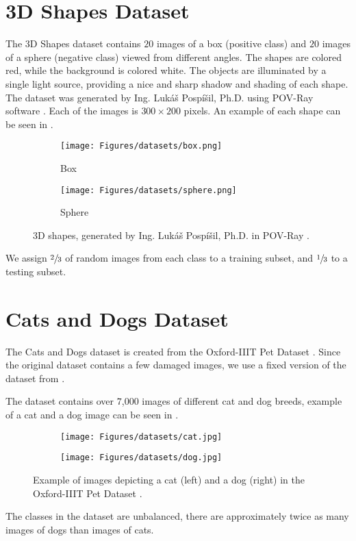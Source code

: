 \section{3D Shapes Dataset}\label{sec:3d-dataset}
The 3D Shapes dataset contains $20$ images of a box (positive class) and $20$ images of a sphere (negative class) viewed from different angles. The shapes are colored red, while the background is colored white. The objects are illuminated by a single light source, providing a nice and sharp shadow and shading of each shape. The dataset was generated by Ing. Lukáš Pospíšil, Ph.D. using POV-Ray software \cite{povray}. Each of the images is $300\times200$ pixels. An example of each shape can be seen in .
\begin{figure}[ht]
    \centering
    \begin{subfigure}[t]{0.3\textwidth}
        \texttt{[image: Figures/datasets/box.png]}
        \caption{Box}
    \end{subfigure}
    \begin{subfigure}[t]{0.3\textwidth}
        \texttt{[image: Figures/datasets/sphere.png]}
        \caption{Sphere}
    \end{subfigure}
    \caption[3D shapes, generated by Ing. Lukáš Pospíšil, Ph.D. in POV-Ray]{3D shapes, generated by Ing. Lukáš Pospíšil, Ph.D. in POV-Ray \cite{povray}.}
    \label{fig:3d_shapes}
\end{figure}

We assign $\sfrac{2}{3}$ of random images from each class to a training subset, and $\sfrac{1}{3}$ to a testing subset.

\section{Cats and Dogs Dataset}\label{sec:cat_dog_dataset}
The Cats and Dogs dataset is created from the Oxford-IIIT Pet Dataset \cite{parkhi12a}. Since the original dataset contains a few damaged images, we use a fixed version of the dataset from \cite{ml4py_dataset}.

The dataset contains over $7$,$000$ images of different cat and dog breeds, example of a cat and a dog image can be seen in .
\begin{figure}[!ht]
    \centering
    \begin{subfigure}[t]{0.45\textwidth}
        \texttt{[image: Figures/datasets/cat.jpg]}
        \label{fig:original:example_cat}
    \end{subfigure}\hfill
    \begin{subfigure}[t]{0.45\textwidth}
        \texttt{[image: Figures/datasets/dog.jpg]}
        \label{fig:original:example_dog}
    \end{subfigure}
    \caption[Example of images depicting a cat (left) and a dog (right) in the Oxford-IIIT Pet Dataset]{Example of images depicting a cat (left) and a dog (right) in the Oxford-IIIT Pet Dataset \cite{parkhi12a}.}
    \label{fig:iiit_pet}
\end{figure}
The classes in the dataset are unbalanced, there are approximately twice as many images of dogs than images of cats.

